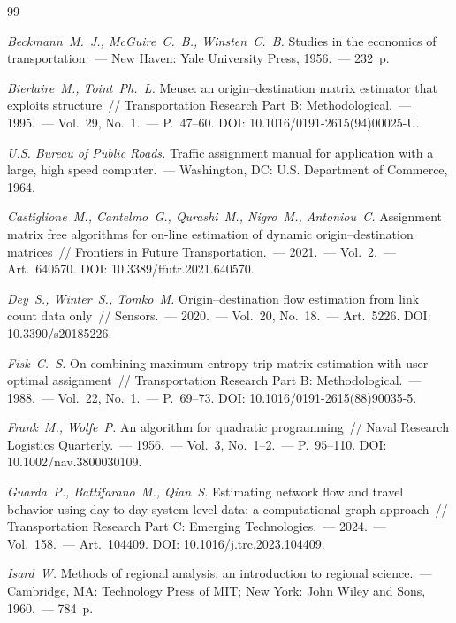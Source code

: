 \documentclass{crm-article}
\begin{document}
\begin{thebibliography}{99}

{\it Beckmann~M.~J., McGuire~C.~B., Winsten~C.~B.}
Studies in the economics of transportation.~--- New Haven: Yale University
Press, 1956.~--- 232~p.

{\it Bierlaire~M., Toint~Ph.~L.}
Meuse: an origin--destination matrix estimator that exploits structure~//
Transportation Research Part B: Methodological.~--- 1995.~--- Vol.~29,
No.~1.~--- P.~47--60. DOI: 10.1016/0191-2615(94)00025-U.

{\it U.S. Bureau of Public Roads.}
Traffic assignment manual for application with a large, high speed
computer.~--- Washington, DC: U.S. Department of Commerce, 1964.

{\it Castiglione~M., Cantelmo~G., Qurashi~M., Nigro~M., Antoniou~C.}
Assignment matrix free algorithms for on-line estimation of dynamic
origin--destination matrices~// Frontiers in Future Transportation.~---
2021.~--- Vol.~2.~--- Art.~640570.
DOI: 10.3389/ffutr.2021.640570.

{\it Dey~S., Winter~S., Tomko~M.}
Origin--destination flow estimation from link count data only~//
Sensors.~--- 2020.~--- Vol.~20, No.~18.~--- Art.~5226.
DOI: 10.3390/s20185226.

{\it Fisk~C.~S.}
On combining maximum entropy trip matrix estimation with user optimal
assignment~// Transportation Research Part B: Methodological.~--- 1988.~---
Vol.~22, No.~1.~--- P.~69--73. DOI: 10.1016/0191-2615(88)90035-5.

{\it Frank~M., Wolfe~P.}
An algorithm for quadratic programming~// Naval Research Logistics
Quarterly.~--- 1956.~--- Vol.~3, No.~1--2.~--- P.~95--110.
DOI: 10.1002/nav.3800030109.

{\it Guarda~P., Battifarano~M., Qian~S.}
Estimating network flow and travel behavior using day-to-day system-level
data: a computational graph approach~// Transportation Research Part C:
Emerging Technologies.~--- 2024.~--- Vol.~158.~--- Art.~104409.
DOI: 10.1016/j.trc.2023.104409.

{\it Isard~W.}
Methods of regional analysis: an introduction to regional science.~---
Cambridge, MA: Technology Press of MIT; New York: John Wiley and Sons,
1960.~--- 784~p.


\end{thebibliography}
\end{document}
